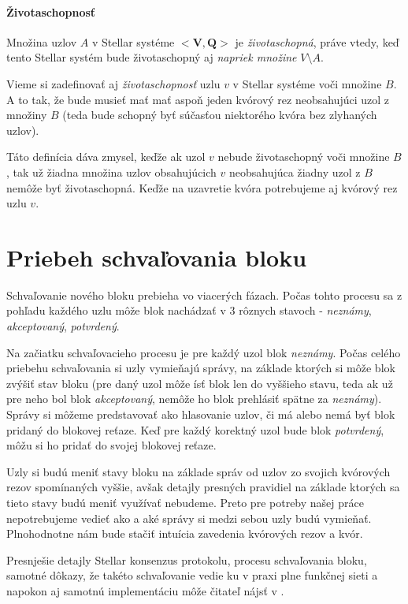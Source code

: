 \paragraph {Životaschopnosť}
Množina uzlov $A$ v Stellar systéme $<\textbf{V}, \textbf{Q}>$ je
\textit{životaschopná}, práve vtedy, keď tento Stellar systém bude životaschopný
aj \textit{napriek množine} $V \setminus A$.

\vspace{5mm}
Vieme si zadefinovať aj \textit{životaschopnosť} uzlu $v$ v Stellar systéme voči
množine $B$. A to tak, že bude musieť mať mať aspoň jeden kvórový rez neobsahujúci
uzol z množiny $B$ (teda bude schopný byť súčasťou niektorého kvóra bez zlyhaných uzlov).

Táto definícia dáva zmysel, keďže ak uzol $v$ nebude životaschopný voči množine $B$,
tak už žiadna množina uzlov obsahujúcich $v$ neobsahujúca žiadny uzol z $B$
nemôže byť životaschopná. Keďže na uzavretie kvóra potrebujeme aj kvórový rez uzlu $v$.

\section {Priebeh schvaľovania bloku}

Schvaľovanie nového bloku prebieha vo viacerých fázach. Počas tohto procesu sa 
z pohľadu každého uzlu môže blok nachádzať v 3 rôznych stavoch -
\textit{neznámy}, \textit{akceptovaný}, \textit{potvrdený}.

Na začiatku schvaľovacieho procesu je pre každý uzol blok \textit{neznámy}.
Počas celého priebehu schvaľovania si uzly vymieňajú správy, na základe ktorých
si môže blok zvýšiť stav bloku (pre daný uzol môže ísť blok len do vyššieho
stavu, teda ak už pre neho bol blok \textit{akceptovaný}, nemôže ho blok
prehlásiť spätne za \textit{neznámy}).
Správy si môžeme predstavovať ako hlasovanie uzlov, či má alebo nemá byť
blok pridaný do blokovej reťaze.
Keď pre každý korektný uzol bude blok \textit{potvrdený}, môžu si ho pridať
do svojej blokovej reťaze.

Uzly si budú meniť stavy bloku na základe správ od uzlov zo svojich kvórových rezov
spomínaných vyššie, avšak detajly presných pravidiel na základe ktorých sa tieto
stavy budú meniť využívať nebudeme.
Preto pre potreby našej práce nepotrebujeme vedieť ako a aké správy si medzi
sebou uzly budú vymieňať.
Plnohodnotne nám bude stačiť intuícia zavedenia kvórových rezov a kvór.

Presnješie detajly Stellar konsenzus protokolu, procesu schvaľovania bloku,
samotné dôkazy, že takéto schvaľovanie vedie ku v praxi plne funkčnej sieti a
napokon aj samotnú implementáciu môže čitateľ nájsť v \cite{mazieres2015stellar}.


